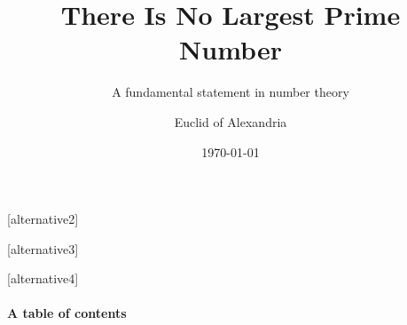 \documentclass[aspectratio=169]{beamer}
\title{There Is No Largest Prime Number}
\subtitle{A fundamental statement in number theory}
\date{\today}
\author[Euclid]{Euclid of Alexandria}
\begin{document}
\begin{frame}
\titlepage
\end{frame}

[alternative2]


\begin{frame}
	\titlepage
\end{frame}

[alternative3]

\titlegraphic{}

\begin{frame}
	\titlepage
\end{frame}

[alternative4]


\begin{frame}
	\titlepage
\end{frame}

\begin{frame}
	\framesubtitle{A table of contents}
	\tocpage
\end{frame}
\end{document}
